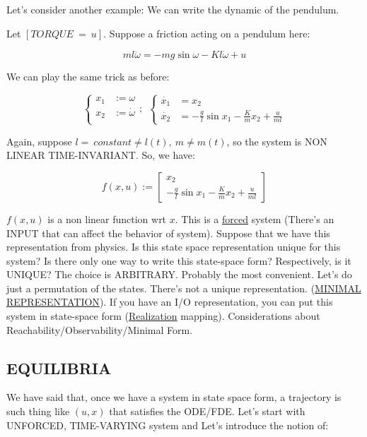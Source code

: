 Let's consider another example: We can write the dynamic of the pendulum.

Let $[TORQUE\ =\ u]$. Suppose a friction acting on a pendulum here:

\[
	ml\ddot{\omega} = -mg\sin{\omega} - Kl\dot{\omega} + u
\]

We can play the same trick as before:

\[
	\left\{
	\begin{aligned}
	x_1 &:= \omega \\
	x_2 &:= \dot{\omega} \\
	\end{aligned} 
	\right.
	;\ \ \left\{
	\begin{aligned}
	\dot{x_1} &= x_2 \\
	\dot{x_2} &= -\frac{g}{l}\sin{x_1} - \frac{K}{m}x_2 + \frac{u}{ml}
	\end{aligned} 
	\right.
\]

Again, suppose $l =\ constant \neq l(t),\ m \neq m(t)$, so the system is NON LINEAR TIME-INVARIANT. So, we have:

\[
	f(x,u) :=
	\begin{bmatrix}
	x_2 \\
	-\frac{g}{l}\sin{x_1} - \frac{K}{m}x_2 + \frac{u}{ml}
	\end{bmatrix}
\]

$f(x,u)$ is a non linear function wrt $x$. This is a \underline{forced} system (There's an INPUT that can affect the behavior of system). Suppose that we have this representation from physics. Is this state space representation unique for this system? Is there only one way to write this state-space form? Respectively, is it UNIQUE? The choice is ARBITRARY. Probably the most convenient. Let's do just a permutation of the states. There's not a unique representation. (\underline{MINIMAL REPRESENTATION}). If you have an I/O representation, you can put this system in state-space form (\underline{Realization} mapping). Considerations about Reachability/Observability/Minimal Form.

\subsection{EQUILIBRIA}

We have said that, once we have a system in state space form, a trajectory is such thing like $(u,x)$ that satisfies the ODE/FDE. Let's start with UNFORCED, TIME-VARYING system and Let's introduce the notion of:

